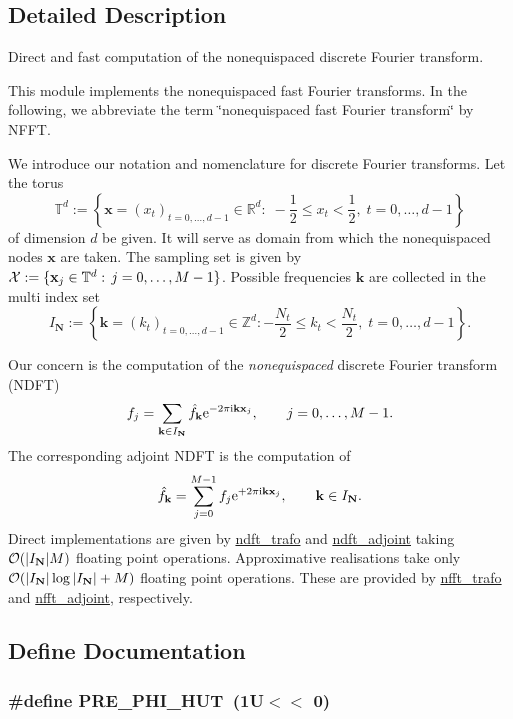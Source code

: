 \subsection{Detailed Description}
Direct and fast computation of the nonequispaced discrete Fourier transform. 

This module implements the nonequispaced fast Fourier transforms. In the following, we abbreviate the term \char`\"{}nonequispaced fast Fourier transform\char`\"{} by NFFT.

We introduce our notation and nomenclature for discrete Fourier transforms. Let the torus \[ \mathbb{T}^d := \left\{ \mathbf{x}=\left(x_t\right)_{t=0,\hdots,d-1}\in\mathbb{R}^{d}: \; - \frac{1}{2} \le x_t < \frac{1}{2},\; t=0,\hdots,d-1 \right\} \] of dimension $d$ be given. It will serve as domain from which the nonequispaced nodes $\mathbf{x}$ are taken. The sampling set is given by ${\cal X}:=\{\mathbf{x}_j \in {\mathbb T}^d: \,j=0,\hdots,M-1\}$. Possible frequencies $\mathbf{k}$ are collected in the multi index set \[ I_{\mathbf{N}} := \left\{ \mathbf{k}=\left(k_t\right)_{t=0,\hdots,d-1}\in \mathbb{Z}^d: - \frac{N_t}{2} \le k_t < \frac{N_t}{2} ,\;t=0,\hdots,d-1 \right\}. \]

Our concern is the computation of the {\em nonequispaced\/} discrete Fourier transform {\em \/}(NDFT) \label{group__nfft_ndft_formula}
\hypertarget{group__nfft_ndft_formula}{}
 \[ f_j = \sum_{\mathbf{k}\in I_{\mathbf{N}}} \hat{f}_{\mathbf{k}} {\rm e}^{-2\pi{\rm i} \mathbf{k}\mathbf{x}_j}, \qquad j=0,\hdots,M-1. \] The corresponding adjoint NDFT is the computation of \[ \hat f_{\mathbf{k}}=\sum_{j=0}^{M-1} f_j {\rm e}^{+2\pi{\rm i} \mathbf{k}\mathbf{x}_j}, \qquad \mathbf{k}\in I_{\mathbf{N}}. \] Direct implementations are given by \hyperlink{group__nfft_g27ef1bcb8dd3a3fc1cdbeee368ec1acf}{ndft\_\-trafo} and \hyperlink{group__nfft_g03975608fdf8cfd8757f1f52b43ec51b}{ndft\_\-adjoint} taking ${\cal O}(|I_{\mathbf{N}}|M)$ floating point operations. Approximative realisations take only ${\cal O}(|I_{\mathbf{N}}|\log|I_{\mathbf{N}}|+M)$ floating point operations. These are provided by \hyperlink{group__nfft_g9f1e6bd9f7f956a8679e6b413c97b421}{nfft\_\-trafo} and \hyperlink{group__nfft_g4b44c1dd52026dcb494dc735f0fa5b08}{nfft\_\-adjoint}, respectively. 

\subsection{Define Documentation}
\hypertarget{group__nfft_gda3a356fdaf5840f98374a0a7aaf3e9c}{
\subsubsection{\setlength{\rightskip}{0pt plus 5cm}\#define PRE\_\-PHI\_\-HUT~(1U$<$$<$ 0)}}
\label{group__nfft_gda3a356fdaf5840f98374a0a7aaf3e9c}


